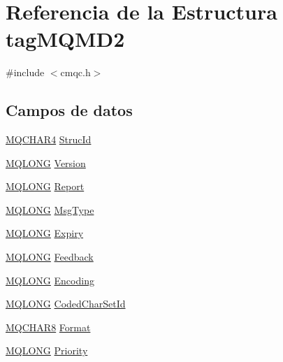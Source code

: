 \hypertarget{structtag_m_q_m_d2}{}\section{Referencia de la Estructura tag\+M\+Q\+M\+D2}
\label{structtag_m_q_m_d2}


{\ttfamily \#include $<$cmqc.\+h$>$}

\subsection*{Campos de datos}
\begin{DoxyCompactItemize}
\item 
\hyperlink{cmqc_8h_a12590e546ed66fda7cf21c1d5cefa31d}{M\+Q\+C\+H\+A\+R4} \hyperlink{structtag_m_q_m_d2_a0530922ca944569b52601d74941f96e4}{Struc\+Id}
\item 
\hyperlink{cmqc_8h_a1fb8d28cbda3fa8766a9821230cdb6d5}{M\+Q\+L\+O\+N\+G} \hyperlink{structtag_m_q_m_d2_a0656ef8f766b3907d394d88a35d7b7e9}{Version}
\item 
\hyperlink{cmqc_8h_a1fb8d28cbda3fa8766a9821230cdb6d5}{M\+Q\+L\+O\+N\+G} \hyperlink{structtag_m_q_m_d2_a3e6ae3e2f087fe6fc26cc75004fbc790}{Report}
\item 
\hyperlink{cmqc_8h_a1fb8d28cbda3fa8766a9821230cdb6d5}{M\+Q\+L\+O\+N\+G} \hyperlink{structtag_m_q_m_d2_a22732037d5385ab03eb3e9d9a5e60843}{Msg\+Type}
\item 
\hyperlink{cmqc_8h_a1fb8d28cbda3fa8766a9821230cdb6d5}{M\+Q\+L\+O\+N\+G} \hyperlink{structtag_m_q_m_d2_a85cb54f2f2a97fe071fcad54d22a92a9}{Expiry}
\item 
\hyperlink{cmqc_8h_a1fb8d28cbda3fa8766a9821230cdb6d5}{M\+Q\+L\+O\+N\+G} \hyperlink{structtag_m_q_m_d2_a9cb2f407eb097aa9cdc246dc18059987}{Feedback}
\item 
\hyperlink{cmqc_8h_a1fb8d28cbda3fa8766a9821230cdb6d5}{M\+Q\+L\+O\+N\+G} \hyperlink{structtag_m_q_m_d2_a30167bf454a49a60fd3fe4e9e586af34}{Encoding}
\item 
\hyperlink{cmqc_8h_a1fb8d28cbda3fa8766a9821230cdb6d5}{M\+Q\+L\+O\+N\+G} \hyperlink{structtag_m_q_m_d2_a4d8d1961a991850d1355cdf9b4680b8e}{Coded\+Char\+Set\+Id}
\item 
\hyperlink{cmqc_8h_abddcedb8c41fa262f2bd05dfec3e60a5}{M\+Q\+C\+H\+A\+R8} \hyperlink{structtag_m_q_m_d2_a435a478822008713f8aaff89f369ed63}{Format}
\item 
\hyperlink{cmqc_8h_a1fb8d28cbda3fa8766a9821230cdb6d5}{M\+Q\+L\+O\+N\+G} \hyperlink{structtag_m_q_m_d2_a72c542b9e2952a489df0cb84755c1fa6}{Priority}

\end{DoxyCompactItemize}
